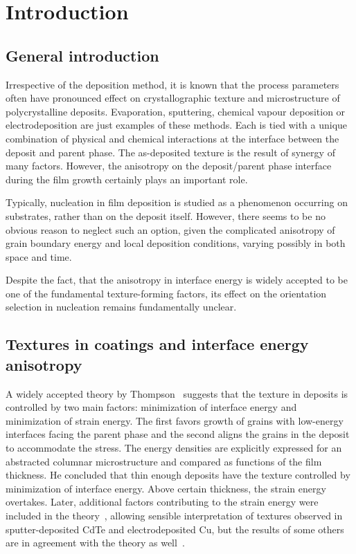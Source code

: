 \chapter{Introduction} \label{ch_introduction}


\section{General introduction}
Irrespective of the deposition method, it is known that the process parameters often have pronounced effect on crystallographic texture and microstructure of polycrystalline deposits. Evaporation, sputtering, chemical vapour deposition or electrodeposition are just examples of these methods. Each is tied with a unique combination of physical and chemical interactions at the interface between the deposit and parent phase. The as-deposited texture is the result of synergy of many factors. However, the anisotropy on the deposit/parent phase interface during the film growth certainly plays an important role. 

Typically, nucleation in film deposition is studied as a phenomenon occurring on substrates, rather than on the deposit itself. However, there seems to be no obvious reason to neglect such an option, given the complicated anisotropy of grain boundary energy and local deposition conditions, varying possibly in both space and time. 

Despite the fact, that the anisotropy in interface energy is widely accepted to be one of the fundamental texture-forming factors, its effect on the orientation selection in nucleation remains fundamentally unclear. 

\section{Textures in coatings and interface energy anisotropy}
A widely accepted theory by Thompson~\cite{Thompson1993} suggests that the texture in deposits is controlled by two main factors: minimization of interface energy and minimization of strain energy. The first favors growth of grains with low-energy interfaces facing the parent phase and the second aligns the grains in the deposit to accommodate the stress. The energy densities are explicitly expressed for an abstracted columnar microstructure and compared as functions of the film thickness. He concluded that thin enough deposits have the texture controlled by minimization of interface energy. Above certain thickness, the strain energy overtakes. Later, additional factors contributing to the strain energy were included in the theory~\cite{Consonni2008}, allowing sensible interpretation of textures observed in sputter-deposited CdTe and electrodeposited Cu, but the results of some others are in agreement with the theory as well~\cite{SonnweberRibic2006, Sanchez1992}. 

